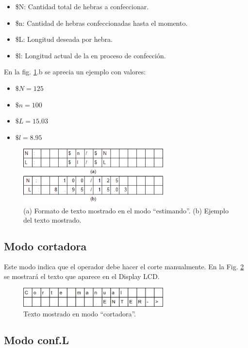 \documentclass[main_conf.tex]{subfiles}
\begin{document}
\begin{itemize}
\item \$N: Cantidad total de hebras a confeccionar.
\item \$n: Cantidad de hebras confeccionadas hasta el momento.
\item \$L: Longitud deseada por hebra.
\item \$l: Longitud actual de la en proceso de confección.
\end{itemize}

En la fig. \ref{Modo_estimando}.b se aprecia un ejemplo con valores:
\begin{itemize}
\item $\$N = 125$
\item $\$n = 100$
\item $\$L = 15.03$
\item $\$l = 8.95$
\end{itemize}

\begin{figure}[!h]
  \centering
  \includegraphics[width=3.0in]{../img/modo/estimando.png}
  \caption{(a) Formato de texto mostrado en el modo “estimando”.
           (b) Ejemplo del texto mostrado.
  }
  \label{Modo_estimando}
\end{figure}

\subsection{Modo cortadora}
Este modo indica que el operador debe hacer el corte manualmente.
En la Fig. \ref{Modo_cortadora} se mostrará el texto que
aparece en el Display LCD.

\begin{figure}[!t]
  \centering
  \includegraphics[width=3.0in]{../img/modo/cortadora.png}
  \caption{Texto mostrado en modo “cortadora”.}
  \label{Modo_cortadora}
\end{figure}

\subsection{Modo conf.L}
\end{document}
